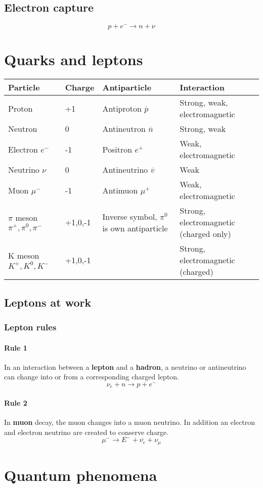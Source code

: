 \documentclass{article}[18pt]
\begin{document}
\subsection{Electron capture}
$$p+e^-\rightarrow n+\nu$$
\section{Quarks and leptons}
\begin{tabularx}{\textwidth}{|X|X|X|X|}
\hline
Particle&Charge&Antiparticle&Interaction\\
\hline
Proton&+1&Antiproton $\overline{p}$&Strong, weak, electromagnetic\\
\hline
Neutron&0&Antineutron $\overline{n}$&Strong, weak\\
\hline
Electron $e^-$&-1&Positron $e^+$&Weak, electromagnetic\\
\hline
Neutrino $\nu$&0&Antineutrino $\overline{v}$&Weak\\
\hline
Muon $\mu^-$&-1&Antimuon $\mu^+$&Weak, electromagnetic\\
\hline
$\pi$ meson $\pi^+,\pi^0,\pi^-$&+1,0,-1&Inverse symbol, $\pi^0$ is own antiparticle&Strong, electromagnetic (charged only)\\
\hline
K meson $K^+,K^0,K^-$&+1,0,-1&&Strong, electromagnetic (charged)\\
\hline
\end{tabularx}
\subsection{Leptons at work}
\subsubsection{Lepton rules}
\paragraph{Rule 1}
In an interaction between a \textbf{lepton} and a \textbf{hadron}, a neutrino or antineutrino can change into or from a corresponding charged lepton.
$$\nu_e+n\rightarrow p+e^-$$
\paragraph{Rule 2}
In \textbf{muon} decay, the muon changes into a muon neutrino. In addition an electron and electron neutrino are created to conserve charge.
$$\mu^-\rightarrow E^-+\overline{\nu_e}+\nu_\mu$$
\section{Quantum phenomena}
\end{document}
